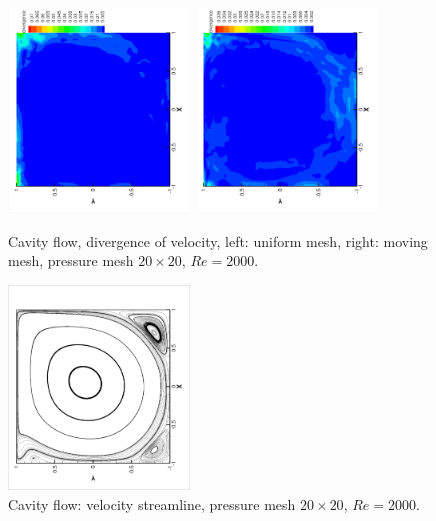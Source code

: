 \documentclass{eajam}
\begin{document}
       \begin{figure}[!htbp]
         \begin{center}
             \includegraphics[width = 0.43\textwidth, angle = -90]{picture/cavity_flow_data/divergence_uniform_1.eps}
             \includegraphics[width = 0.43\textwidth, angle = -90]{picture/cavity_flow_data/divergence_moving_1.eps}
        \end{center}
        \caption{\small Cavity flow, divergence of velocity, left: uniform mesh,
          right: moving mesh, pressure mesh $20 \times 20$, $Re = 2000$.}
        \label{fig::cavity_flow_divergence}
       \end{figure}
       
       \begin{figure}[!htbp]
         \begin{center}
             \includegraphics[width = 0.43\textwidth, angle = -90]{picture/cavity_flow_data/streamline_mesh20.eps}
        \end{center}
        \caption{\small Cavity flow: velocity streamline, pressure
          mesh $20 \times 20$, $Re = 2000$.}
        \label{fig::cavity_flow_streamline}
       \end{figure}
\end{document}
